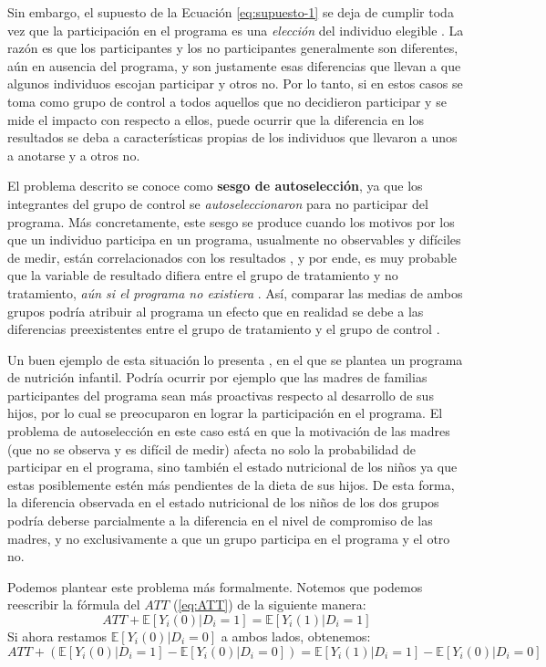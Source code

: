 \documentclass[../../main.tex]{subfiles}
\begin{document}
Sin embargo, el supuesto de la Ecuación \ref{eq:supuesto-1} se deja de cumplir toda vez
que la participación en el programa es una \textit{elección} del individuo elegible
\cite{bernal}. La razón es que los participantes y los no participantes generalmente son
diferentes, aún en ausencia del programa, y son justamente esas diferencias que llevan a
que algunos individuos escojan participar y otros no. Por lo tanto, si en estos casos se
toma como grupo de control a todos aquellos que no decidieron participar y se mide el
impacto con respecto a ellos, puede ocurrir que la diferencia en los resultados se deba a
características propias de los individuos que llevaron a unos a anotarse y a otros no.

El problema descrito se conoce como \textbf{sesgo de autoselección}, ya que los
integrantes del grupo de control se \textit{autoseleccionaron} para no participar del
programa. Más concretamente, este sesgo se produce cuando los motivos por los que un
individuo participa en un programa, usualmente no observables y difíciles de medir, están
correlacionados con los resultados \cite{gertler-2016}, y por ende, es muy probable que la
variable de resultado difiera entre el grupo de tratamiento y no tratamiento, \textit{aún
si el programa no existiera} \cite{bernal}. Así, comparar las medias de ambos grupos
podría atribuir al programa un efecto que en realidad se debe a las diferencias
preexistentes entre el grupo de tratamiento y el grupo de control \cite{bernal}.

Un buen ejemplo de esta situación lo presenta \cite{bernal}, en el que se plantea un
programa de nutrición infantil. Podría ocurrir por ejemplo que las madres de familias
participantes del programa sean más proactivas respecto al desarrollo de sus hijos, por lo
cual se preocuparon en lograr la participación en el programa. El problema de
autoselección en este caso está en que la motivación de las madres (que no se observa y es
difícil de medir) afecta no solo la probabilidad de participar en el programa, sino
también el estado nutricional de los niños ya que estas posiblemente estén más pendientes
de la dieta de sus hijos. De esta forma, la diferencia observada en el estado nutricional
de los niños de los dos grupos podría deberse parcialmente a la diferencia en el nivel de
compromiso de las madres, y no exclusivamente a que un grupo participa en el programa y el
otro no.

Podemos plantear este problema más formalmente. Notemos que podemos reescribir la fórmula
del \(ATT\) (\ref{eq:ATT}) de la siguiente manera:
\begin{equation}
    ATT + \mathbb{E} \left[Y_i(0)|D_i=1\right] = \mathbb{E} \left[Y_i(1)|D_i=1\right]
    \label{eq:ATT2}
\end{equation}
Si ahora restamos \(\mathbb{E} \left[Y_i(0)|D_i=0\right]\) a ambos lados, obtenemos:
\begin{equation}
    ATT + \left( \mathbb{E} \left[Y_i(0)|D_i=1\right] - \mathbb{E} \left[Y_i(0)|D_i=0\right] \right) =
    \mathbb{E} \left[Y_i(1)|D_i=1\right] - \mathbb{E} \left[Y_i(0)|D_i=0\right]\
    \label{eq:ATT3}
\end{equation}
\end{document}
